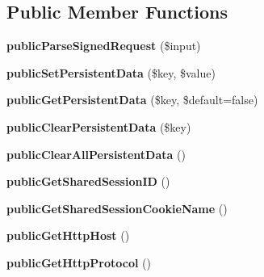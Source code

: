 \subsection*{Public Member Functions}
\begin{DoxyCompactItemize}
\item 
\hypertarget{class_persistent_f_b_public_a1ef8d6334375029145caa9ae775000bf}{{\bfseries public\-Parse\-Signed\-Request} (\$input)}\label{class_persistent_f_b_public_a1ef8d6334375029145caa9ae775000bf}

\item 
\hypertarget{class_persistent_f_b_public_a16967fb6233e62b73106c28df1c80a1e}{{\bfseries public\-Set\-Persistent\-Data} (\$key, \$value)}\label{class_persistent_f_b_public_a16967fb6233e62b73106c28df1c80a1e}

\item 
\hypertarget{class_persistent_f_b_public_a4cf2a43e7244c76e524abe4032c3a666}{{\bfseries public\-Get\-Persistent\-Data} (\$key, \$default=false)}\label{class_persistent_f_b_public_a4cf2a43e7244c76e524abe4032c3a666}

\item 
\hypertarget{class_persistent_f_b_public_a2429056df9d7df72fdf9da7141bcc0a2}{{\bfseries public\-Clear\-Persistent\-Data} (\$key)}\label{class_persistent_f_b_public_a2429056df9d7df72fdf9da7141bcc0a2}

\item 
\hypertarget{class_persistent_f_b_public_ae61d0902969a53523a97a1cb4eca638a}{{\bfseries public\-Clear\-All\-Persistent\-Data} ()}\label{class_persistent_f_b_public_ae61d0902969a53523a97a1cb4eca638a}

\item 
\hypertarget{class_persistent_f_b_public_a74a27791513c26c34441e9cbf65d81d6}{{\bfseries public\-Get\-Shared\-Session\-I\-D} ()}\label{class_persistent_f_b_public_a74a27791513c26c34441e9cbf65d81d6}

\item 
\hypertarget{class_persistent_f_b_public_ab333ea1f69a988974d453809350ccd6b}{{\bfseries public\-Get\-Shared\-Session\-Cookie\-Name} ()}\label{class_persistent_f_b_public_ab333ea1f69a988974d453809350ccd6b}

\item 
\hypertarget{class_persistent_f_b_public_ace234c687eb67da96146f7653afae7ee}{{\bfseries public\-Get\-Http\-Host} ()}\label{class_persistent_f_b_public_ace234c687eb67da96146f7653afae7ee}

\item 
\hypertarget{class_persistent_f_b_public_a3c587f47ad0e12192292dd1097ef5ff2}{{\bfseries public\-Get\-Http\-Protocol} ()}\label{class_persistent_f_b_public_a3c587f47ad0e12192292dd1097ef5ff2}

\end{DoxyCompactItemize}
